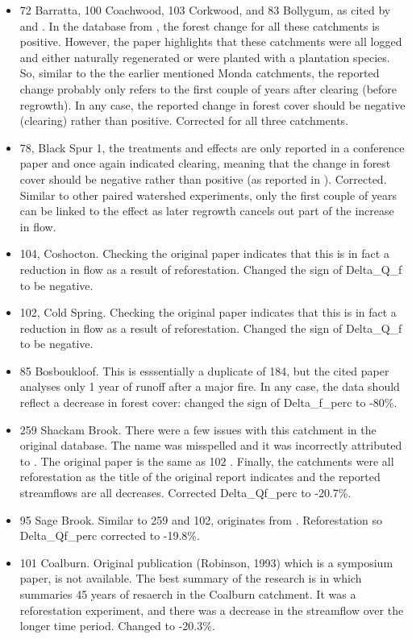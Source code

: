 \documentclass[]{elsarticle} %
\begin{document}
\begin{itemize}
\item
  72 Barratta, 100 Coachwood, 103 Corkwood, and 83 Bollygum, as cited by \citet{cornish1993} and \citet{cornish2001}. In the database from \citet{zhang2017}, the forest change for all these catchments is positive. However, the paper highlights that these catchments were all logged and either naturally regenerated or were planted with a plantation species. So, similar to the the earlier mentioned Monda catchments, the reported change probably only refers to the first couple of years after clearing (before regrowth). In any case, the reported change in forest cover should be negative (clearing) rather than positive. Corrected for all three catchments.\\
\item
  78, Black Spur 1, the treatments and effects are only reported in a conference paper \citep{jayasuriya1988} and once again indicated clearing, meaning that the change in forest cover should be negative rather than positive (as reported in \citet{zhang2017}). Corrected. Similar to other paired watershed experiments, only the first couple of years can be linked to the effect as later regrowth cancels out part of the increase in flow.\\
\item
  104, Coshocton. Checking the original paper indicates that this is in fact a reduction in flow as a result of reforestation. Changed the sign of Delta\_Q\_f to be negative.\\
\item
  102, Cold Spring. Checking the original paper \citep{schneider1961} indicates that this is in fact a reduction in flow as a result of reforestation. Changed the sign of Delta\_Q\_f to be negative.\\
\item
  85 Bosboukloof. This is esssentially a duplicate of 184, but the cited paper analyses only 1 year of runoff after a major fire. In any case, the data should reflect a decrease in forest cover: changed the sign of Delta\_f\_perc to -80\%.\\
\item
  259 Shackam Brook. There were a few issues with this catchment in the original database. The name was misspelled and it was incorrectly attributed to \citet{brown2005}. The original paper is the same as 102 \citep{schneider1961}. Finally, the catchments were all reforestation as the title of the original report indicates and the reported streamflows are all decreases. Corrected Delta\_Qf\_perc to -20.7\%.\\
\item
  95 Sage Brook. Similar to 259 and 102, originates from \citet{schneider1961}. Reforestation so Delta\_Qf\_perc corrected to -19.8\%.\\
\item
  101 Coalburn. Original publication (Robinson, 1993) which is a symposium paper, is not available. The best summary of the research is in \citet{birkinshaw2014} which summaries 45 years of resaerch in the Coalburn catchment. It was a reforestation experiment, and there was a decrease in the streamflow over the longer time period. Changed to -20.3\%.
\end{itemize}
\end{document}
